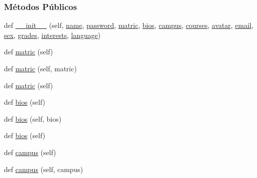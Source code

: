 \subsubsection*{Métodos Públicos}
\begin{DoxyCompactItemize}
\item 
def \hyperlink{classELO_1_1EntityUnit_1_1Student_aef59a6e543a5f05412f6550ff73d5e75}{\+\_\+\+\_\+init\+\_\+\+\_\+} (self, \hyperlink{classELO_1_1EntityUnit_1_1Student_a33329ec1da0181f6305626b4444a8e0b}{name}, \hyperlink{classELO_1_1EntityUnit_1_1Student_a834cad492221bfe3f26e590666e13f9a}{password}, \hyperlink{classELO_1_1EntityUnit_1_1Student_a7a58dc9ae8d071372ef2036a82fcb3ae}{matric}, \hyperlink{classELO_1_1EntityUnit_1_1Student_a148e46f8d5bb2a3dedb9590edbb2471e}{bios}, \hyperlink{classELO_1_1EntityUnit_1_1Student_aeff51011a4e35705fb6aefc54e1d4f35}{campus}, \hyperlink{classELO_1_1EntityUnit_1_1Student_a4fc13f8b92b03ab40b6f97e753109056}{courses}, \hyperlink{classELO_1_1EntityUnit_1_1Student_a63479fe42a5a5e1dffc988221a807a6a}{avatar}, \hyperlink{classELO_1_1EntityUnit_1_1Student_ac072120adf3ee4078fe3ef7f17e61a1f}{email}, \hyperlink{classELO_1_1EntityUnit_1_1Student_a5ca85c1d00044512e5dc3cfabac4ff9f}{sex}, \hyperlink{classELO_1_1EntityUnit_1_1Student_a7ab2e46886024eced2bc61195dbc2008}{grades}, \hyperlink{classELO_1_1EntityUnit_1_1Student_a8777212f16975f658ff8f75e47f2c554}{interests}, \hyperlink{classELO_1_1EntityUnit_1_1Student_ad58a5d0f4e75b34e6c2b93ac05b59faf}{language})
\item 
def \hyperlink{classELO_1_1EntityUnit_1_1Student_a78e51bbd0ee73338c7b5a1bad920cc85}{matric} (self)
\item 
def \hyperlink{classELO_1_1EntityUnit_1_1Student_ac943decb5b8e5f8ce32c05952edd57cf}{matric} (self, matric)
\item 
def \hyperlink{classELO_1_1EntityUnit_1_1Student_a78e51bbd0ee73338c7b5a1bad920cc85}{matric} (self)
\item 
def \hyperlink{classELO_1_1EntityUnit_1_1Student_a7306ddc98cd0b6c05bc83637a02823bb}{bios} (self)
\item 
def \hyperlink{classELO_1_1EntityUnit_1_1Student_a1cfe822c1a311bd8b6a0c03bdcfb241c}{bios} (self, bios)
\item 
def \hyperlink{classELO_1_1EntityUnit_1_1Student_a7306ddc98cd0b6c05bc83637a02823bb}{bios} (self)
\item 
def \hyperlink{classELO_1_1EntityUnit_1_1Student_a27ffe4ddb3005b38226c0a7b5eab0142}{campus} (self)
\item 
def \hyperlink{classELO_1_1EntityUnit_1_1Student_a613a08c24ee1dbe6611442ff2d14ad94}{campus} (self, campus)

\end{DoxyCompactItemize}
